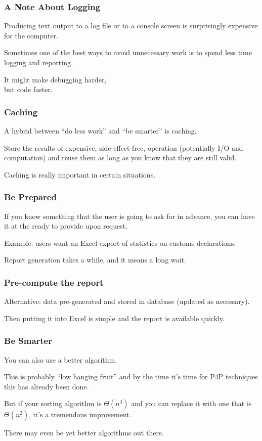 \begin{frame}
\frametitle{A Note About Logging}
\Large
Producing text output to a log file or to a console screen is surprisingly expensive for the computer. 

Sometimes one of the best ways to avoid unnecessary work is to spend less time logging and reporting. 

It might make debugging harder, \\
but code faster.

\end{frame}

\begin{frame}
\frametitle{Caching}

\Large
A hybrid between ``do less work'' and ``be smarter'' is caching. 

Store the results of expensive, side-effect-free, operation
(potentially I/O and computation) and reuse them as long as you
know that they are still valid. 

Caching is really important in certain situations.


\end{frame}




\begin{frame}
\frametitle{Be Prepared}

\Large
If you know something that the user is going to ask for in advance, you can have it at the ready to provide upon request. 

Example: users want an Excel export of statistics on customs declarations. 

Report generation takes a while, and it means a long wait. 
\end{frame}

\begin{frame}
\frametitle{Pre-compute the report}

\Large
Alternative: data pre-generated and stored in database (updated as necessary).

Then putting it into Excel is simple and the report is available quickly.


\end{frame}



\begin{frame}
\frametitle{Be Smarter}
\Large

You can also use a better algorithm. 

This is probably ``low hanging fruit'' and by the time it's time for P4P techniques this has already been done. 

But if your sorting algorithm is $\Theta(n^{3})$ and you can replace it with one that is $\Theta(n^{2})$, it's a tremendous improvement.

There may even be yet better algorithms out there.


\end{frame}




